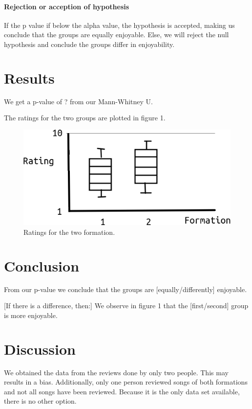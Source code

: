 \documentclass{article}
\begin{document}
\paragraph{Rejection or acception of hypothesis}
If the p value if below the alpha value,
the hypothesis is accepted, making us conclude
that the groups are equally enjoyable.
Else, we will reject the null hypothesis
and conclude the groups differ in enjoyability.

\section{Results}

We get a p-value of ? from our
Mann-Whitney U. 

The ratings for the two groups are plotted in
figure 1. 

\begin{figure}[!htbp]
  \includegraphics[width=\textwidth]{figure_1.png}
  \caption{
    Ratings for the two formation. 
  }
  \label{fig:1}
\end{figure}

\section{Conclusion}

From our p-value we conclude that
the groups are [equally/differently] enjoyable.

[If there is a difference, then:]
We observe in figure 1 that the [first/second]
group is more enjoyable.

\section{Discussion}

We obtained the data from the reviews done
by only two people. This may results in
a bias. 
Additionally, only one person reviewed
songs of both formations and not all
songs have been reviewed.
Because it is the only data
set available, there is no other option.
\end{document}
